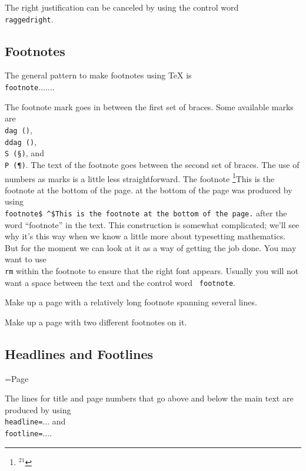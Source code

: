 The right justification can be canceled by using the 
control word {\tt \\raggedright}. 
 
\subsection{Footnotes} 
 
The general pattern to make footnotes using \TeX{} is 
{\tt \\footnote\lb$\ldots$\rb\lb$\ldots$\rb}\null. 
 
The footnote mark goes in between the first set of braces.  Some 
available marks are {\tt \\dag (\dag)}, {\tt \\ddag (\ddag)}, {\tt \\S 
(\S)}, and {\tt \\P (\P)}\null.  The text of the footnote 
goes between the second set of braces. The use of numbers as 
marks is a little less straightforward. The footnote%
\footnote{${}^{21}$}{This is the footnote at the bottom of the page.} 
at the bottom of the page was produced by using {\tt \\footnote\lb\$\lb 
\rb\^{}\rb\$\rb\lb This is the footnote at the 
bottom of the page.\rb}  after the word ``footnote'' in the 
text. This construction is somewhat complicated; we'll see why 
it's this way when we know a little more about typesetting 
mathematics. But for the moment we can look at it as a way of 
getting the job done. You may want to use {\tt \\rm} within the 
footnote to ensure that the right font appears. Usually you will 
not want a space between the text and the control word {\tt 
footnote}. 
 
\exercise Make up a page with a relatively long footnote spanning 
several lines. 
 
\exercise Make up a page with two different footnotes on it. 
 
\subsection{Headlines and Footlines} 
 
\headline={\hfil \tenrm Page \the\pageno} %
 
The lines for title and page numbers that go above and below the 
main text are produced by using {\tt \\headline=\lb$\dots$\rb} 
and {\tt \\footline=\lb$\dots$\rb}\null. 
 
